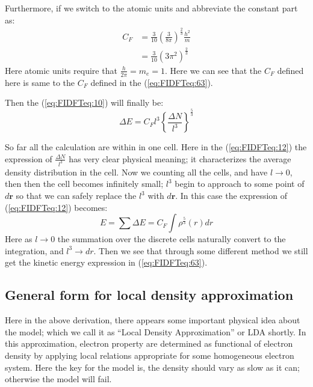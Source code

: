 Furthermore, if we switch to the atomic units and abbreviate the
constant part as:
\begin{align}
  \label{eq:FIDFTeq:11}
  C_{F} &= \frac{3}{10}\left(\frac{3}{8\pi}\right)^{\frac{2}{3}}
  \frac{h^{2}}{m} \nonumber \\
  &= \frac{3}{10}(3\pi^{2})^{\frac{2}{3}}
\end{align}
Here atomic units require that $\frac{h}{2\pi} = m_{e} = 1$. Here we
can see that the $C_{F}$ defined here is same to the $C_{F}$ defined
in the (\ref{eq:FIDFTeq:63}).

Then the (\ref{eq:FIDFTeq:10}) will finally be:
\begin{equation}
  \label{eq:FIDFTeq:12}
  \Delta E = C_{F}l^{3}\left\{\frac{\Delta N}{l^{3}}\right\}^{\frac{5}{3}}
\end{equation}

So far all the calculation are within in one cell. Here in the
(\ref{eq:FIDFTeq:12}) the expression of $\frac{\Delta N}{l^{3}}$ has
very clear physical meaning; it characterizes the average density
distribution in the cell. Now we counting all the cells, and have
$l\rightarrow 0$, then then the cell becomes infinitely small; $l^{3}$
begin to approach to some point of $d\mathbf{r}$ so that we can safely
replace the $l^{3}$ with $d\mathbf{r}$. In this case the expression of
(\ref{eq:FIDFTeq:12}) becomes:
\begin{equation}
  \label{eq:FIDFTeq:13} E = \sum \Delta E = C_{F}\int
\rho^{\frac{5}{3}}(r)dr
\end{equation}
Here as $l \rightarrow 0$ the summation over the discrete cells
naturally convert to the integration, and $l^{3} \rightarrow dr$. Then
we see that through some different method we still get the kinetic
energy expression in (\ref{eq:FIDFTeq:63}).



\subsection{General form for local density approximation}
%
%
%
Here in the above derivation, there appears some important physical
idea about the model; which we call it as ``Local Density
Approximation'' or LDA shortly\cite{HK2}. In this approximation, electron
property are determined as functional of electron density by applying
local relations appropriate for some homogeneous electron system. Here
the key for the model is, the density should vary as slow as it can;
otherwise the model will fail.

